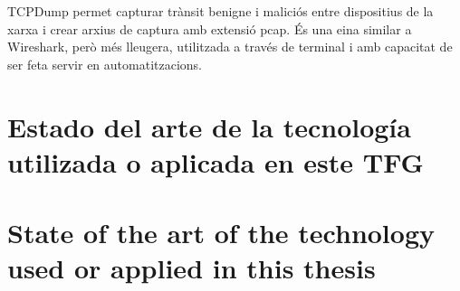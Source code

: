     TCPDump permet capturar trànsit benigne i maliciós entre dispositius de la xarxa i crear arxius de captura amb extensió pcap. És una eina similar a Wireshark, però més lleugera, utilitzada a través de terminal i amb capacitat de ser feta servir en automatitzacions.
    
    \or
  \chapter[Estado del arte]{Estado del arte de la tecnología utilizada o aplicada en este TFG}

\else
  \chapter[State of the art]{State of the art of the technology used or applied in this thesis}

\fi



